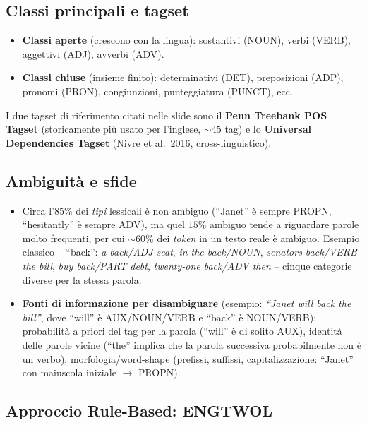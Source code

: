 \documentclass[12pt,a4paper]{article}
\begin{document}
\subsection{Classi principali e tagset}

\begin{itemize}[leftmargin=1.5em]
  \item \textbf{Classi aperte} (crescono con la lingua): sostantivi (NOUN), verbi (VERB), aggettivi (ADJ), avverbi (ADV).
  \item \textbf{Classi chiuse} (insieme finito): determinativi (DET), preposizioni (ADP), pronomi (PRON), congiunzioni, punteggiatura (PUNCT), ecc.
\end{itemize}
I due tagset di riferimento citati nelle slide sono il \textbf{Penn Treebank POS Tagset} (storicamente più usato per l'inglese, $\sim 45$ tag) e lo \textbf{Universal Dependencies Tagset} (Nivre et al.\ 2016, cross-linguistico).

\subsection{Ambiguità e sfide}

\begin{itemize}[leftmargin=1.5em]
  \item Circa l'$85\%$ dei \emph{tipi} lessicali è non ambiguo (``Janet'' è sempre PROPN, ``hesitantly'' è sempre ADV), ma quel $15\%$ ambiguo tende a riguardare parole molto frequenti, per cui $\sim 60\%$ dei \emph{token} in un testo reale è ambiguo. Esempio classico -- ``back'': \textit{a back/ADJ seat}, \textit{in the back/NOUN}, \textit{senators back/VERB the bill}, \textit{buy back/PART debt}, \textit{twenty-one back/ADV then} -- cinque categorie diverse per la stessa parola.
  \item \textbf{Fonti di informazione per disambiguare} (esempio: \textit{``Janet will back the bill''}, dove ``will'' è AUX/NOUN/VERB e ``back'' è NOUN/VERB): probabilità a priori del tag per la parola (``will'' è di solito AUX), identità delle parole vicine (``the'' implica che la parola successiva probabilmente non è un verbo), morfologia/word-shape (prefissi, suffissi, capitalizzazione: ``Janet'' con maiuscola iniziale $\to$ PROPN).
\end{itemize}

\subsection{Approccio Rule-Based: ENGTWOL}
\end{document}
